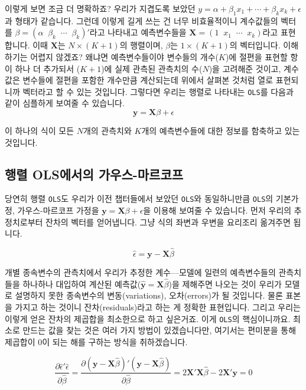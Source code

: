 \documentclass[
]{book}
\begin{document}
이렇게 보면 조금 더 명확하죠? 우리가 지겹도록 보았던 \(y = \alpha + \beta_1x_1 + \cdots + \beta_kx_k + \epsilon\)과 형태가 같습니다. 그런데 이렇게 길게 쓰는 건 너무 비효율적이니 계수값들의 벡터를 \(\beta = (\alpha\;\;\beta_k\;\;\cdots\;\; \beta_k)'\)라고 나타내고 예측변수들을 \(\textbf{X} = (1\;\;x_1\;\;\cdots\;\; x_k)\)라고 표현합니다. 이때 \(\textbf{X}\)는 \(N\times(K+1)\)의 행렬이며, \(\beta\)는 \(1\times(K+1)\)의 벡터입니다. 이해하기는 어렵지 않겠죠? 왜냐면 예측변수들이야 변수들의 개수(\(K\))에 절편을 표현할 항이 하나 더 추가되서 (\(K+1\))에 실제 관측된 관측치의 수(\(N\))을 고려해준 것이고, 계수값은 변수들에 절편을 포함한 개수만큼 계산되는데 위에서 살펴본 것처럼 열로 표현되니까 벡터라고 할 수 있는 것입니다. 그렇다면 우리는 행렬로 나타내는 \texttt{OLS}를 다음과 같이 심플하게 보여줄 수 있습니다.
\[
\textbf{y} = \textbf{X}\beta+\epsilon
\]

이 하나의 식이 모든 \(N\)개의 관측치와 \(K\)개의 예측변수들에 대한 정보를 함축하고 있는 것입니다.

\hypertarget{uxd589uxb82c-olsuxc5d0uxc11cuxc758-uxac00uxc6b0uxc2a4-uxb9c8uxb974uxcf54uxd504}{%
\subsection{행렬 OLS에서의 가우스-마르코프}\label{uxd589uxb82c-olsuxc5d0uxc11cuxc758-uxac00uxc6b0uxc2a4-uxb9c8uxb974uxcf54uxd504}}

당연히 행렬 \texttt{OLS}도 우리가 이전 챕터들에서 보았던 \texttt{OLS}와 동일하니만큼 \texttt{OLS}의 기본가정, 가우스-마르코프 가정을 \(\textbf{y} = \textbf{X}\beta+\epsilon\)을 이용해 보여줄 수 있습니다. 먼저 우리의 추정치로부터 잔차의 벡터를 얻어냅니다. 그냥 식의 좌변과 우변을 요리조리 옮겨주면 됩니다.

\[
 \hat{\epsilon} = \textbf{y}-\textbf{X}\hat{\beta}
\]

개별 종속변수의 관측치에서 우리가 추정한 계수---모델에 일련의 예측변수들의 관측치들을 하나하나 대입하여 계산된 예측값(\(\hat{\textbf{y}} = \textbf{X}\hat{\beta}\))을 제해주면 나오는 것이 우리가 모델로 설명하지 못한 종속변수의 변동(variations), 오차(errors)가 될 것입니다. 물론 표본을 가지고 하는 것이니 잔차(residuals)라고 하는 게 정확한 표현입니다. 그리고 우리는 이렇게 얻은 잔차의 제곱합을 최소한으로 하고 싶은거죠. 이게 \texttt{OLS}의 핵심이니까요. 최소로 만드는 값을 찾는 것은 여러 가지 방법이 있겠습니다만, 여기서는 편미분을 통해 제곱합이 0이 되는 해를 구하는 방식을 취하겠습니다.

\[
\frac{\partial \hat{\epsilon}'\hat{\epsilon}}{\partial\hat{\beta}} = \frac{\partial(\textbf{y}-\textbf{X}\hat{\beta})'(\textbf{y}-\textbf{X}\hat{\beta})}{\partial \hat{\beta}} = 2\textbf{X}'\textbf{X}\hat{\beta}-2\textbf{X}'\textbf{y} = 0
\]
\end{document}
